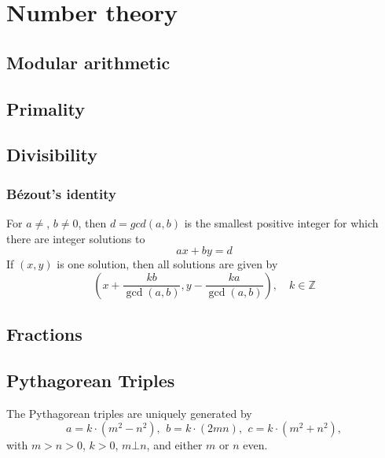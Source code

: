 \section{Number theory}

\subsection{Modular arithmetic}

\subsection{Primality}

\subsection{Divisibility}

	\subsubsection{Bézout's identity}
	For $a \neq $, $b \neq 0$, then $d=gcd(a,b)$ is the smallest positive integer for which there are integer solutions to
	$$ax+by=d$$
	If $(x,y)$ is one solution, then all solutions are given by
	$$\left(x+\frac{kb}{\gcd(a,b)}, y-\frac{ka}{\gcd(a,b)}\right), \quad k\in\mathbb{Z}$$


\subsection{Fractions}

\subsection{Pythagorean Triples}
 The Pythagorean triples are uniquely generated by
 \[ a=k\cdot (m^{2}-n^{2}),\ \,b=k\cdot (2mn),\ \,c=k\cdot (m^{2}+n^{2}), \]
 with $m > n > 0$, $k > 0$, $m \bot n$, and either $m$ or $n$ even.

